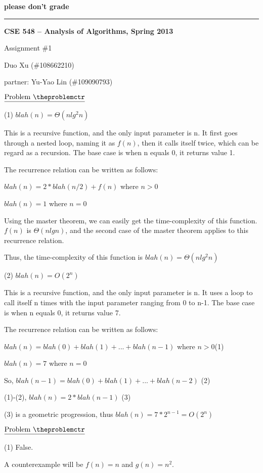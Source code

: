 \documentclass[11pt]{article}
\def\pp{\par\noindent}
\begin{document}
\centerline{\bf please don't grade}
\medskip
\hrule
\bigskip
\centerline{\bf CSE 548 -- Analysis of Algorithms, Spring 2013}
\medskip
\centerline{Assignment \#1}
\medskip
\centerline{Duo Xu (\#108662210)}
\medskip
\centerline{partner: Yu-Yao Lin (\#109090793)}
\bigskip
\bigskip


\addtocounter{problemctr}{1}
\bigskip
\noindent
$\underline{\rm Problem\ \theproblemctr}$\pp

\noindent
(1) $blah(n) = \Theta(nlg^{2}n)$

This is a recursive function, and the only input parameter is n. It first goes through a nested loop, naming it as $f(n)$, then it calls itself twice, which can be regard as a recursion. The base case is when n equals 0, it returns value 1.

The recurrence relation can be written as follows:

$blah(n) = 2*blah(n/2)+f(n)$ where $n>0$

$blah(n) = 1$ where $n=0$

Using the master theorem, we can easily get the time-complexity of this function. $f(n)$ is $\Theta(nlgn)$, and the second case of the master theorem applies to this recurrence relation.

Thus, the time-complexity of this function is $blah(n) = \Theta(nlg^{2}n)$

\bigskip
\bigskip
\noindent
(2) $blah(n) = O(2^{n})$

This is a recursive function, and the only input parameter is n. It uses a loop to call itself n times with the input parameter ranging from 0 to n-1. The base case is when n equals 0, it returns value 7.

The recurrence relation can be written as follows:

$blah(n) = blah(0)+blah(1)+...+blah(n-1)$ where $n>0$\hfill(1)

$blah(n) = 7$ where $n=0$

So, $blah(n-1) = blah(0)+blah(1)+...+blah(n-2)$ \hfill(2)

(1)-(2), $blah(n) = 2*blah(n-1)$ \hfill(3) 

(3) is a geometric progression, thus $blah(n) = 7*2^{n-1} = O(2^{n})$

\vfill
\newpage
\addtocounter{problemctr}{1}
\bigskip
\noindent
$\underline{\rm Problem\ \theproblemctr}$\pp
\noindent
(1) False.

A counterexample will be $f(n) = n$ and $g(n) = n^2$.
\end{document}
